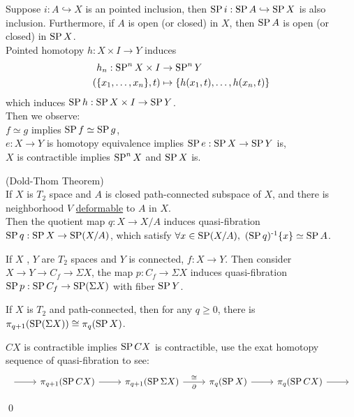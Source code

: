     Suppose $i : A \hookrightarrow X$ is an pointed inclusion,
    then $\operatorname{SP} i : \operatorname{SP} A \hookrightarrow \operatorname{SP} X$ is also inclusion.
    Furthermore, if $A$ is open (or closed) in $X$, then $\operatorname{SP} A$ is open (or closed) in $\operatorname{SP} X$.\\

    Pointed homotopy $h : X \times I \to Y$ induces
    \begin{align*}
        h_n : \operatorname{SP}^n X \times I & \to \operatorname{SP}^{n}Y\\
            (\{x_1, \dots, x_n\} , t) & \mapsto \{h(x_1,t), \dots, h(x_n,t)\}
    \end{align*}
    which induces $\operatorname{SP} h : \operatorname{SP} X \times I \to \operatorname{SP} Y$.\\


    Then we observe:\\
    $f \simeq g$ implies $\operatorname{SP} f \simeq \operatorname{SP} g$,\\
    $e : X \to Y$ is homotopy equivalence implies $\operatorname{SP} e : \operatorname{SP} X \to \operatorname{SP} Y$ is,\\
    $X$ is contractible implies $\operatorname{SP}^n X$ and $\operatorname{SP} X$ is.


    \begin{thm}
        (Dold-Thom Theorem)\label{hyp:Dold-Thom}\\
        If $X$ is $T_2$ space and $A$ is closed path-connected subspace of $X$,
        and there is neighborhood $V$ \hyperref[hyp:deformable]{deformable} to $A$ in $X$.\\
        Then the quotient map $q : X \to X/A$ induces quasi-fibration
        $\operatorname{SP} q : \operatorname{SP} X \to \operatorname{SP} (X/A)$, which satisfy
        $\forall x \in \operatorname{SP} (X/A), \ (\operatorname{SP} q)^{\text{-}1} \{x\} \simeq  \operatorname{SP} A $.

    \end{thm}

    \begin{cor}
        If $X$ , $Y$ are $T_2$ spaces and $Y$ is connected, $f : X \to Y$.
        Then consider $X \to Y \to C_f \to \Sigma X$,
        the map $p : C_f \to \Sigma X$ induces quasi-fibration
        $\operatorname{SP} p : \operatorname{SP} C_f \to \operatorname{SP} (\Sigma X)$ with fiber $\operatorname{SP} Y$.
    \end{cor}

    \begin{cor}
        If $X$ is $T_2$ and path-connected, then for any $q\geq 0$,
        there is $\pi_{q+1}(\operatorname{SP} (\Sigma X)) \cong \pi_q (\operatorname{SP} X)$.
    \end{cor}

    \begin{prf}
        $CX$ is contractible implies $\operatorname{SP} CX$ is contractible,
        use the exat homotopy sequence of quasi-fibration to see:
        \[\begin{tikzcd}
            {} & {\pi_{q+1}(\SP CX)} & {\pi_{q+1}(\SP \Sigma X)} & {\pi_q (\SP X)} & {\pi_q(\SP CX)} & {}
            \arrow[from=1-2, to=1-3]
            \arrow["\partial"', "\cong", from=1-3, to=1-4]
            \arrow[from=1-1, to=1-2]
            \arrow[from=1-4, to=1-5]
            \arrow[from=1-5, to=1-6]
        \end{tikzcd}\]

        \qed
    \end{prf}

